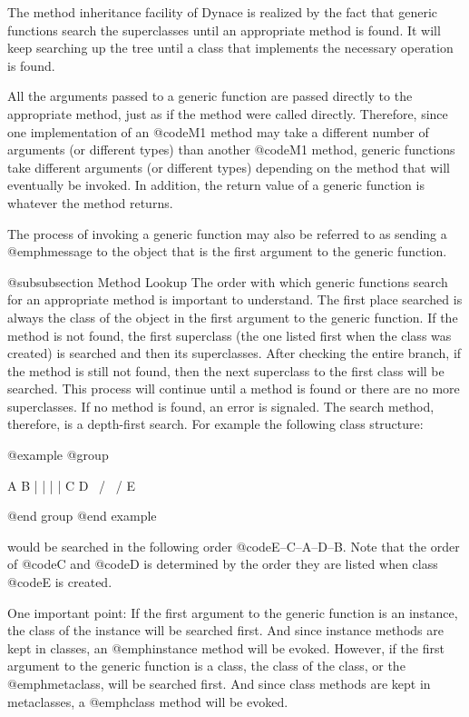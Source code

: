 The method inheritance facility of Dynace is realized by the fact that
generic functions search the superclasses until an appropriate
method is found.  It will keep searching up the tree until a class
that implements the necessary operation is found.

All the arguments passed to a generic function are passed directly to
the appropriate method, just as if the method were called directly.
Therefore, since one implementation of an @code{M1} method may take a
different number of arguments (or different types) than another @code{M1}
method, generic functions take different arguments (or different types)
depending on the method that will eventually be invoked.  In addition,
the return value of a generic function is whatever the method returns.

The process of invoking a generic function may also be referred to as
sending a @emph{message} to the object that is the first argument to
the generic function.

@subsubsection Method Lookup
The order with which generic functions search for an appropriate method
is important to understand.  The first place searched is always the
class of the object in the first argument to the generic function.  If
the method is not found, the first superclass (the one listed first when
the class was created) is searched and then its superclasses.  After
checking the entire branch, if the method is still not found, then the next
superclass to the first class will be searched.  This process will
continue until a method is found or there are no more superclasses.  If
no method is found, an error is signaled.  The search method, therefore,
is a depth-first search.  For example the following class structure:

@example
@group

               A     B
               |     |
               |     |
               C     D
                \   /
                 \ /
                  E

@end group
@end example

would be searched in the following order @code{E--C--A--D--B}.  Note that
the order of @code{C} and @code{D} is determined by the order they are
listed when class @code{E} is created.

One important point:  If the first argument to the generic function is
an instance, the class of the instance will be searched first.  And
since instance methods are kept in classes, an @emph{instance} method
will be evoked.  However, if the first argument to the generic function
is a class, the class of the class, or the @emph{metaclass}, will be
searched first.  And since class methods are kept in metaclasses, a
@emph{class} method will be evoked.

